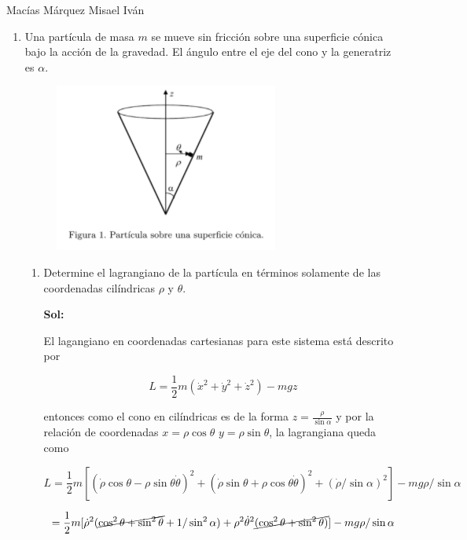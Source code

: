 \documentclass[12pt,a4paper]{article}
\begin{document}
Macías Márquez Misael Iván

\begin{enumerate}





\item Una partícula de masa $m$ se mueve sin fricción sobre una superficie cónica bajo la acción de la gravedad. El ángulo entre el eje del cono y la generatriz es $\alpha$.

    \begin{figure}[h!]
        \centering
        \includegraphics{1.PNG}
    \end{figure}

\begin{enumerate}
    \item Determine el lagrangiano de la partícula en términos solamente de las coordenadas cilíndricas $\rho$ y $\theta$.
    
    \textbf{Sol:}
    
    El lagangiano en coordenadas cartesianas para este sistema está descrito por
    
    \begin{equation*}
        L = \frac{1}{2} m (\dot{x}^2 + \dot{y}^2 + \dot{z}^2)  - mgz
    \end{equation*}
    
    entonces como el cono en cilíndricas es de la forma $z = \frac{\rho}{\sin{\alpha}} $ y por la relación de coordenadas $x = \rho \cos{\theta}$  $y = \rho \sin{\theta}$, la lagrangiana queda como
    
    \begin{equation*}
        L = \frac{1}{2} m [(\dot{\rho} \cos{\theta}- \rho \sin{\theta} \dot{\theta})^2 + (\dot{\rho} \sin{\theta}+ \rho \cos{\theta}\dot{\theta})^2 + (\dot{\rho}/\sin{\alpha})^2] - mg\rho/\sin{\alpha}
    \end{equation*}
    
    \begin{equation*}
        = \frac{1}{2}m [\dot{\rho}^2 (\cancel{\cos^2{\theta} + \sin^2{\theta}} + 1/\sin^2{\alpha}) + \rho^2 \dot{\theta}^2 \cancel{(\cos^2{\theta} + \sin^2{\theta})}] - mg\rho / \sin{\alpha}
    \end{equation*}
    

\end{enumerate}
\end{enumerate}
\end{document}
